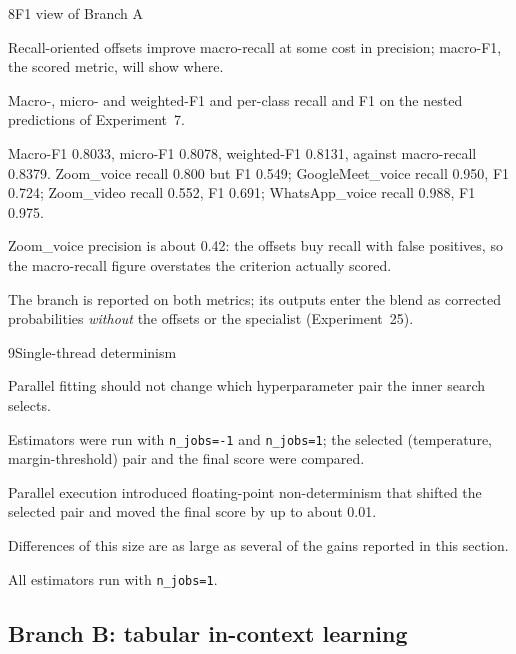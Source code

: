 \begin{explog}{8}{F1 view of Branch A}
\item[Hypothesis] Recall-oriented offsets improve macro-recall at some cost in precision;
macro-F1, the scored metric, will show where.
\item[Method] Macro-, micro- and weighted-F1 and per-class recall and F1 on the nested
predictions of Experiment~7.
\item[Result] Macro-F1 0.8033, micro-F1 0.8078, weighted-F1 0.8131, against macro-recall
0.8379. Zoom\_voice recall 0.800 but F1 0.549; GoogleMeet\_voice recall 0.950, F1
0.724; Zoom\_video recall 0.552, F1 0.691; WhatsApp\_voice recall 0.988, F1 0.975.
\item[Inference] Zoom\_voice precision is about 0.42: the offsets buy recall with false
positives, so the macro-recall figure overstates the criterion actually scored.
\item[Verdict] The branch is reported on both metrics; its outputs enter the blend as
corrected probabilities \emph{without} the offsets or the specialist
(Experiment~25).
\end{explog}

\begin{explog}{9}{Single-thread determinism}
\item[Hypothesis] Parallel fitting should not change which hyperparameter pair the inner search
selects.
\item[Method] Estimators were run with \texttt{n\_jobs=-1} and \texttt{n\_jobs=1}; the
selected (temperature, margin-threshold) pair and the final score were compared.
\item[Result] Parallel execution introduced floating-point non-determinism that shifted
the selected pair and moved the final score by up to about 0.01.
\item[Inference] Differences of this size are as large as several of the gains reported in
this section.
\item[Verdict] All estimators run with \texttt{n\_jobs=1}.
\end{explog}

\subsection{Branch B: tabular in-context learning}

